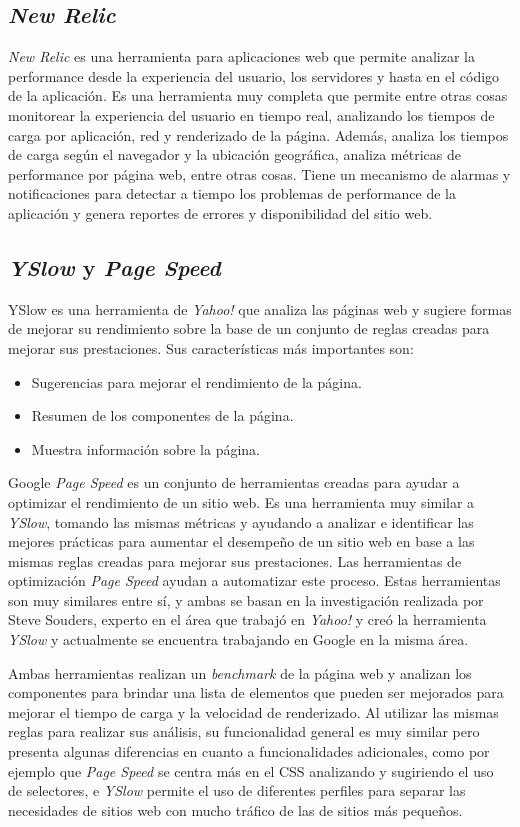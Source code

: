 \subsection{\emph{New Relic}}
\emph{New Relic} \cite{new_relic} es una herramienta para aplicaciones web que permite analizar la performance desde la experiencia del usuario, los servidores y hasta en el código de la aplicación. 
Es una herramienta muy completa que permite entre otras cosas monitorear la experiencia del usuario en tiempo real, analizando los tiempos de carga por aplicación, red y 
renderizado de la página. Además, analiza los tiempos de carga según el navegador y la ubicación geográfica, analiza métricas de performance por página web, entre otras cosas. 
Tiene un mecanismo de alarmas y notificaciones para detectar a tiempo los problemas de performance de la aplicación y genera reportes de errores y disponibilidad del sitio web.

\subsection{\emph{YSlow} y \emph{Page Speed}}
YSlow \cite{yslow} es una herramienta de \emph{Yahoo!} que analiza las páginas web y sugiere formas de mejorar su rendimiento sobre la base de un conjunto de reglas creadas para mejorar sus prestaciones. Sus características más importantes son:
\begin{itemize}
\item
Sugerencias para mejorar el rendimiento de la página.
\item
Resumen de los componentes de la página.
\item
Muestra información sobre la página.
\end{itemize}
Google \emph{Page Speed} \cite{page_speed} es un conjunto de herramientas creadas para ayudar a optimizar el rendimiento de un sitio web. Es una herramienta muy similar a \emph{YSlow}, tomando las mismas métricas y ayudando a analizar e identificar las mejores prácticas para aumentar el desempeño de un sitio web en base a las mismas reglas creadas para mejorar sus prestaciones. Las herramientas de optimización \emph{Page Speed} ayudan a automatizar este proceso.
Estas herramientas son muy similares entre sí, y ambas se basan en la investigación realizada por Steve Souders, experto en el área que trabajó en \emph{Yahoo!} y creó la herramienta \emph{YSlow} y actualmente se encuentra trabajando en Google en la misma área.


Ambas herramientas realizan un \emph{benchmark} de la página web y analizan los componentes para brindar una lista de elementos que pueden ser mejorados para mejorar el tiempo de carga y la velocidad de renderizado. Al utilizar las mismas reglas para realizar sus análisis, su funcionalidad general es muy similar pero presenta algunas diferencias en cuanto a funcionalidades adicionales, como por ejemplo que
\emph{Page Speed} se centra más en el CSS analizando y sugiriendo el uso de selectores, e \emph{YSlow} permite el uso de diferentes perfiles para separar las necesidades de sitios web con mucho tráfico de las de sitios más pequeños.

